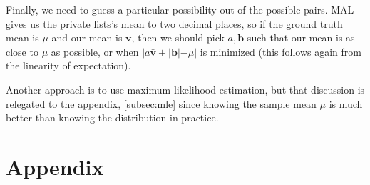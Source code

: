 \documentclass[11pt, oneside]{article}
\renewcommand{\vec}[1]{\bm{#1}}
\theoremstyle{plain}
\theoremstyle{definition}
\begin{document}
Finally, we need to guess a particular possibility out of the possible pairs.
MAL gives us the private lists's mean to two decimal places, so if the ground
truth mean is \( \mu \) and our mean is \( \bar{\vec{v}} \), then we should
pick \( a, \vec{b} \) such that our mean is as close to \( \mu \) as possible,
or when \( | a \bar{\vec{v}} + |\vec{b}| - \mu | \) is minimized (this follows
again from the linearity of expectation).

Another approach is to use maximum likelihood estimation, but that discussion
is relegated to the appendix, \autoref{subsec:mle} since knowing the sample
mean \( \mu \) is much better than knowing the distribution in practice.

\newpage

\section{Appendix}
\end{document}
